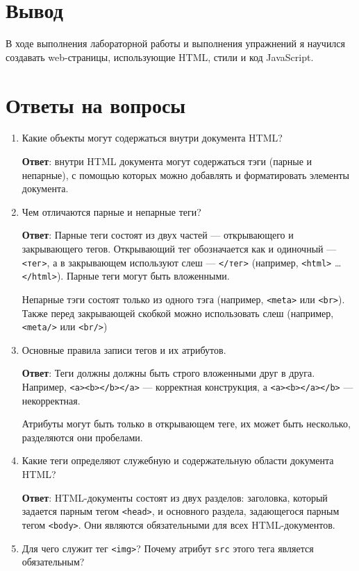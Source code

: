 \documentclass[a4paper, 14pt]{extarticle}
\begin{document}
\section{Вывод}

В ходе выполнения лабораторной работы и выполнения упражнений я научился
создавать web-страницы, использующие HTML, стили и код JavaScript.

\section{Ответы на вопросы}

\begin{enumerate}[leftmargin=*]
  \item Какие объекты могут содержаться внутри документа HTML?

  \textbf{Ответ}: внутри HTML документа могут содержаться тэги (парные и
  непарные), с помощью которых можно добавлять и форматировать элементы
  документа.
  \item Чем отличаются парные и непарные теги?

  \textbf{Ответ}: Парные теги состоят из двух частей --- открывающего и
  закрывающего тегов. Открывающий тег обозначается как и одиночный ---
  \texttt{<тег>}, а в закрывающем используют слеш --- \texttt{</тег>}
  (например, \texttt{<html>} \ldots \texttt{</html>}). Парные теги могут
  быть вложенными.

  Непарные тэги состоят только из одного тэга (например, \texttt{<meta>}
  или \texttt{<br>}). Также перед закрывающей скобкой можно использовать
  слеш (например, \texttt{<meta/>} или \texttt{<br/>})
  \item Основные правила записи тегов и их атрибутов.

  \textbf{Ответ}: Теги должны должны быть строго вложенными друг в друга.
  Например, \texttt{<a><b></b></a>} --- корректная конструкция, а
  \texttt{<a><b></a></b>} --- некорректная.

  Атрибуты могут быть только в открывающем теге, их может быть несколько,
  разделяются они пробелами.
  \item Какие теги определяют служебную и содержательную области документа
  HTML?

  \textbf{Ответ}: HTML-документы состоят из двух разделов: заголовка,
  который задается парным тегом \texttt{<head>}, и основного раздела,
  задающегося парным тегом \texttt{<body>}. Они являются обязательными
  для всех HTML-документов.
  \item Для чего служит тег \texttt{<img>}? Почему атрибут \texttt{src} этого
  тега является обязательным?


\end{enumerate}
\end{document}
